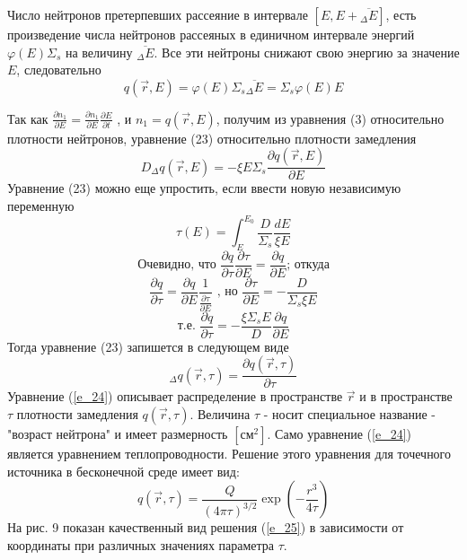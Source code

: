 \documentclass[a4paper]{article}
\begin{document}
    Число нейтронов претерпевших рассеяние в интервале
    $[E, E + \overline{{}_\Delta E}]$, есть произведение числа
    нейтронов рассеяных в единичном интервале энергий
    $\varphi(E)\Sigma_s$ на величину
    $\overline{{}_\Delta E}$. Все эти нейтроны снижают свою энергию
    за значение $E$, следовательно
    \begin{equation}
        q(\vec{r},E) =
        \varphi(E)\Sigma_s\overline{{}_\Delta E} =
        \Sigma_s\varphi(E)E
    \end{equation}

    Так как \(\frac{\partial n_1}{\partial E} =
    \frac{\partial n_1}{\partial E} \frac{\partial E}{\partial t}\)
    , и \(n_1 = q(\vec{r},E)\), получим из уравнения (3)
    относительно плотности нейтронов, уравнение (23) относительно
    плотности замедления
    \begin{equation}
        D_\Delta q(\vec{r}, E) = -\xi E\Sigma_s
        \frac{\partial q(\vec{r}, E)}{\partial E}
    \end{equation}
    Уравнение (23) можно еще упростить, если ввести новую независимую
    переменную
    \begin{equation}\nonumber
        \tau(E) = \int_E^{E_0} \frac{D}{\Sigma_s}\frac{dE}{\xi E}
    \end{equation}
    \begin{equation}
        \text{Очевидно, что }
        \frac{\partial q}{\partial \tau}
        \frac{\partial \tau}{\partial E} =
        \frac{\partial q}{\partial E}
        \text{; откуда}
    \end{equation}
    \begin{equation}
        \frac{\partial q}{\partial \tau} =
        \frac{\partial q}{\partial E}
        \frac{1}{\frac{\partial \tau}{\partial E}}
        \text{ , но }
        \frac{\partial \tau}{\partial E} =
        -\frac{D}{\Sigma_s\xi E}
    \end{equation}
    \begin{equation}\nonumber
        \text{т.е. }
        \frac{\partial q}{\partial \tau} =
        -\frac{\xi\Sigma_s E}{D}\frac{\partial q}{\partial E}
    \end{equation}
    Тогда уравнение (23) запишется в следующем виде
    \begin{equation}\label{e_24}\tag{24}
        {}_\Delta q(\vec{r}, \tau) =
        \frac{\partial q(\vec{r}, \tau)}{\partial \tau}
    \end{equation}
    Уравнение (\ref{e_24}) описывает распределение в пространстве
    $\vec{r}$ и в пространстве $\tau$ плотности
    замедления $q(\vec{r}, \tau)$. Величина $\tau$ - носит
    специальное название - "возраст нейтрона" и имеет размерность
    $[\text{см}^2]$. Само уравнение (\ref{e_24}) является уравнением
    теплопроводности. Решение этого уравнения для точечного источника
    в бесконечной среде имеет вид:
    \begin{equation}\label{e_25}\tag{25}
        q(\vec{r},\tau) =
        \frac{Q}{(4\pi\tau)^{3/2}}
        \exp{(-\frac{r^3}{4\tau})}
    \end{equation}
    На рис. 9 показан качественный вид решения (\ref{e_25}) в
    зависимости от координаты при различных значениях параметра $\tau$.
\end{document}
